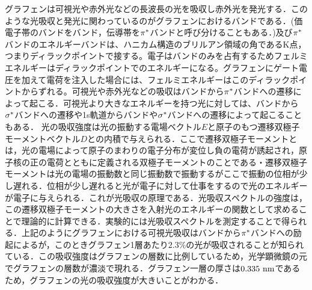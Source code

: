 グラフェンは可視光や赤外光などの長波長の光を吸収し赤外光を発光する．このような光吸収と発光に関わっているのがグラフェンにおける\pi バンドである．(価電子帯のバンドを\pi バンド，伝導帯を$\rm\pi^{*}$バンドと呼び分けることもある．)\pi 及び$\rm\pi^{*}$バンドのエネルギーバンドは、ハニカム構造のブリルアン領域の角であるK点，つまりディラックポイントで接する。電子は\pi バンドのみを占有するためフェルミエネルギーはディラックポイントでのエネルギーになる。グラフェンにゲート電圧を加えて電荷を注入した場合には、フェルミエネルギーはこのディラックポイントからずれる。可視光や赤外光などの吸収は\pi バンドから$\rm\pi^{*}$バンドへの遷移によって起こる．可視光より大きなエネルギーを持つ光に対しては、\sigma バンドから$\rm\sigma^{*}$バンドへの遷移や1s軌道から\sigma バンドや$\rm\sigma^{*}$バンドへの遷移によって起こることもある．
光の吸収強度は光の振動する電場ベクトル$E$と原子のもつ遷移双極子モーメントベクトル$D$との内積で与えられる．ここで遷移双極子モーメントとは，光の電場によって原子のまわりの電子分布が変位し負の電荷が誘起され，原子核の正の電荷とともに定義される双極子モーメントのことである・遷移双極子モーメントは光の電場の振動数と同じ振動数で振動するがここで振動の位相が少し遅れる．位相が少し遅れると光が電子に対して仕事をするので光のエネルギーが電子に与えられる．これが光吸収の原理である．光吸収スペクトルの強度は，この遷移双極子モーメントの大きさを入射光のエネルギーの関数として求めることで理論的に計算できる．実験的には光吸収スペクトルを測定することで得られる．上記のようにグラフェンにおける可視光吸収は\pi バンドから$\rm\pi^{*}$バンドへの励起によるが，このときグラフェン1層あたり$2.3 \%$の光が吸収されることが知られている．この吸収強度はグラフェンの層数に比例しているため，光学顕微鏡の元でグラフェンの層数が濃淡で現れる．グラフェン一層の厚さは$0.335\rm\ nm$であるため，グラフェンの光の吸収強度が大きいことがわかる．
